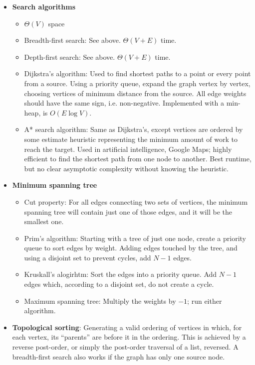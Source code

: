 \documentclass{article}
\begin{document}
\begin{itemize}
    \item \textbf{Search algorithms}
    \begin{itemize}
        \item $\Theta(V)$ space
        \item Breadth-first search: See above. $\Theta(V + E)$ time.
        \item Depth-first search: See above. $\Theta(V + E)$ time.
        \item Dijkstra's algorithm: Used to find shortest paths to a point or every point from a source. Using a priority queue, expand the graph vertex by vertex, choosing vertices of minimum distance from the source. All edge weights should have the same sign, i.e. non-negative. Implemented with a min-heap, is $O(E\log V)$.
        \item A* search algorithm: Same as Dijkstra's, except vertices are ordered by some estimate heuristic representing the minimum amount of work to reach the target. Used in artificial intelligence, Google Maps; highly efficient to find the shortest path from one node to another. Best runtime, but no clear asymptotic complexity without knowing the heuristic.
    \end{itemize}
    \item \textbf{Minimum spanning tree}
    \begin{itemize}
        \item Cut property: For all edges connecting two sets of vertices, the minimum spanning tree will contain just one of those edges, and it will be the smallest one.
        \item Prim's algorithm: Starting with a tree of just one node, create a priority queue to sort edges by weight. Adding edges touched by the tree, and using a disjoint set to prevent cycles, add $N - 1$ edges.
        \item Kruskall's alogirhtm: Sort the edges into a priority queue. Add $N - 1$ edges which, according to a disjoint set, do not create a cycle.
        \item Maximum spanning tree: Multiply the weights by $-1$; run either algorithm.
    \end{itemize}
    \item \textbf{Topological sorting}: Generating a valid ordering of vertices in which, for each vertex, its ``parents'' are before it in the ordering. This is achieved by a reverse post-order, or simply the post-order traversal of a list, reversed. A breadth-first search also works if the graph has only one source node.
\end{itemize}
\end{document}
